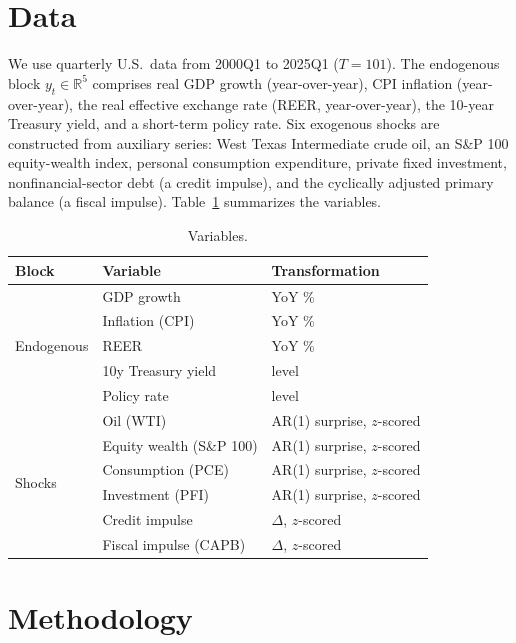 \documentclass[conference]{IEEEtran}
\begin{document}
\section{Data}
We use quarterly U.S.\ data from 2000Q1 to 2025Q1 ($T=101$). The endogenous
block $y_t\in\mathbb{R}^5$ comprises real GDP growth (year-over-year), CPI
inflation (year-over-year), the real effective exchange rate (REER, year-over-year),
the 10-year Treasury yield, and a short-term policy rate. Six exogenous shocks
are constructed from auxiliary series: West Texas Intermediate crude oil, an S\&P
100 equity-wealth index, personal consumption expenditure, private fixed
investment, nonfinancial-sector debt (a credit impulse), and the cyclically
adjusted primary balance (a fiscal impulse). Table~\ref{tab:vars} summarizes the
variables.

\begin{table}[t]
\caption{Variables.}
\label{tab:vars}
\centering
\footnotesize
\begin{tabular}{@{}lll@{}}
\toprule
Block & Variable & Transformation \\
\midrule
\multirow{5}{*}{Endogenous}
 & GDP growth & YoY \% \\
 & Inflation (CPI) & YoY \% \\
 & REER & YoY \% \\
 & 10y Treasury yield & level \\
 & Policy rate & level \\
\midrule
\multirow{6}{*}{Shocks}
 & Oil (WTI) & AR(1) surprise, $z$-scored \\
 & Equity wealth (S\&P 100) & AR(1) surprise, $z$-scored \\
 & Consumption (PCE) & AR(1) surprise, $z$-scored \\
 & Investment (PFI) & AR(1) surprise, $z$-scored \\
 & Credit impulse & $\Delta$, $z$-scored \\
 & Fiscal impulse (CAPB) & $\Delta$, $z$-scored \\
\bottomrule
\end{tabular}
\end{table}

\section{Methodology}
\end{document}
